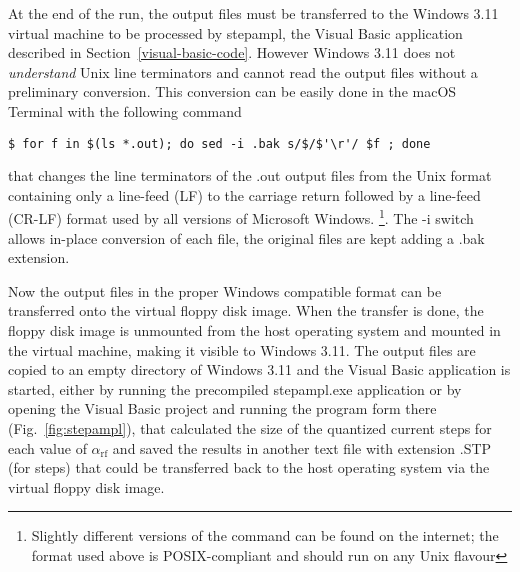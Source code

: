 At the end of the run, the output files must be transferred to the Windows 3.11 virtual machine to be processed by \textsf{stepampl}, the Visual Basic application described in Section~\ref{visual-basic-code}. However Windows 3.11 does not \emph{understand} Unix line terminators and cannot read the output files without a preliminary conversion. 
This conversion can be easily done in the macOS Terminal with the following command

\begin{lstlisting}
$ for f in $(ls *.out); do sed -i .bak s/$/$'\r'/ $f ; done
\end{lstlisting}

that changes the line terminators of the \textsf{.out} output files from the Unix format containing only a line-feed (LF) to the carriage return followed by a line-feed (CR-LF) format used by all versions of Microsoft Windows. 
\footnote{Slightly different versions of the command can be found on the internet; the format used above is POSIX-compliant and should run on any Unix flavour}.
The \textsf{-i} switch allows in-place conversion of each file, the original files are kept adding a \textsf{.bak} extension.

Now the output files in the proper Windows compatible format can be transferred onto the virtual floppy disk image. %
When the transfer is done, the floppy disk image is unmounted from the host operating system and mounted  in the virtual machine, making it visible to Windows 3.11. 
The output files are copied to an empty directory of Windows 3.11 and the Visual Basic application is started, either by running the precompiled \textsf{stepampl.exe} application or by opening the Visual Basic project and running the program form there (Fig.~\ref{fig:stepampl}), that calculated the size of the quantized current steps for each value of $\alpha_\mathrm{rf}$ and saved the results in another text file with extension \textsf{.STP} (for steps) that could be transferred back to the host operating system via the virtual floppy disk image.

